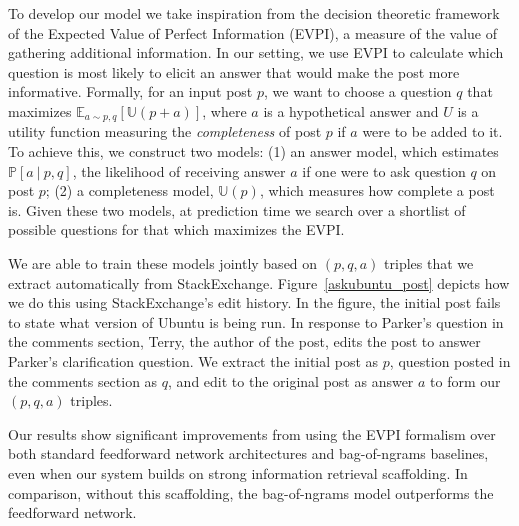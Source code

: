 \documentclass[11pt,a4paper]{article}
\newcommand{\U}{\mathbb{U}}
\begin{document}
To develop our model we take inspiration from the decision theoretic framework of the Expected Value of Perfect Information (EVPI), a measure of the value of gathering additional information. In our setting, we use EVPI to calculate which question is most likely to elicit an answer that would make the post more informative.
Formally, for an input post $p$, we want to choose a question $q$ that maximizes $\mathbb{E}_{a \sim p,q}[\U(p+a)]$, where $a$ is a hypothetical answer and $U$ is a utility function measuring the \emph{completeness} of post $p$ if $a$ were to be added to it.
To achieve this, we construct two models:
(1) an answer model, which estimates $\mathbb{P}[a~|~p,q]$, the likelihood of receiving answer $a$ if one were to ask question $q$ on post $p$;
(2) a completeness model, $\U(p)$, which measures how complete a post is.
Given these two models, at prediction time we search over a shortlist of possible questions for that which maximizes the EVPI.

We are able to train these models jointly based on $(p,q,a)$ triples that we extract automatically from StackExchange.
Figure~\ref{askubuntu_post} depicts how we do this using StackExchange's edit history.  In the figure, the initial post fails to state what version of Ubuntu is being run. In response to Parker's question in the comments section, Terry, the author of the post, edits the post to answer Parker's clarification question. We extract the initial post as $p$, question posted in the comments section as $q$, and edit to the original post as answer $a$ to form our $(p,q,a)$ triples. 

Our results show significant improvements from using the EVPI formalism over both standard feedforward network architectures and bag-of-ngrams baselines, even when our system builds on strong information retrieval scaffolding. In comparison, without this scaffolding, the bag-of-ngrams model outperforms the feedforward network. %
\end{document}
